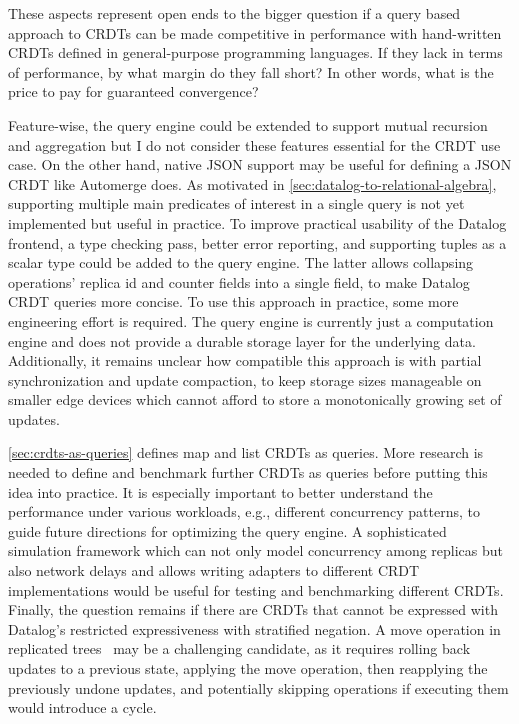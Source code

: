 These aspects represent open ends to the bigger question if a query based
approach to \acp{CRDT} can be made competitive in performance with hand-written
\acp{CRDT} defined in general-purpose programming languages.
If they lack in terms of performance, by what margin do they fall short?
In other words, what is the price to pay for guaranteed convergence?

Feature-wise, the query engine could be extended to support mutual recursion
and aggregation but I do not consider these features essential for the
\ac{CRDT} use case. On the other hand, native JSON support may be useful for
defining a JSON \ac{CRDT} like Automerge does.
As motivated in \ref{sec:datalog-to-relational-algebra}, supporting multiple
main predicates of interest in a single query is not yet implemented but useful
in practice.
To improve practical usability of the Datalog frontend,
a type checking pass, better error reporting, and supporting tuples as a scalar
type could be added to the query engine.
The latter allows collapsing operations' replica id and counter fields
into a single field, to make Datalog \ac{CRDT} queries more concise.
To use this approach in practice, some more engineering effort is required.
The query engine is currently just a computation engine and does not provide
a durable storage layer for the underlying data.
Additionally, it remains unclear how compatible this approach is with
partial synchronization and update compaction, to keep storage sizes manageable
on smaller edge devices which cannot afford to store a monotonically growing
set of updates.

\ref{sec:crdts-as-queries} defines map and list \acp{CRDT} as queries.
More research is needed to define and benchmark further \acp{CRDT} as queries
before putting this idea into practice.
It is especially important to better understand the performance under various
workloads, e.g., different concurrency patterns, to guide future directions
for optimizing the query engine.
A sophisticated simulation framework which can not only model concurrency among
replicas but also network delays and allows writing adapters to different
\ac{CRDT} implementations would be useful for testing and benchmarking
different \acp{CRDT}.
Finally, the question remains if there are \acp{CRDT} that cannot be expressed
with Datalog's restricted expressiveness with stratified negation.
A move operation in replicated trees~\cite{moveop1,moveop2} may be a challenging
candidate, as it requires rolling back updates to a previous state,
applying the move operation, then reapplying the previously undone updates,
and potentially skipping operations if executing them would introduce a cycle.


